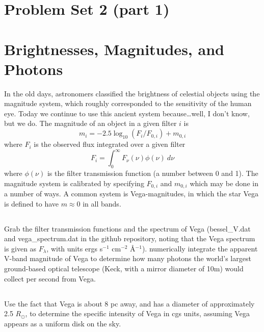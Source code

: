 \documentclass[11pt]{article}
\begin{document}
\pagestyle{empty}
\parindent=0pt

\section*{\centering Problem Set 2 (part 1)}

\section{Brightnesses, Magnitudes, and Photons}

In the old days, astronomers classified the brightness of celestial
objects using the magnitude system, which roughly corresponded to the
sensitivity of the human eye. Today we continue to use this ancient system
because\dots well, I don't know, but we do. The magnitude of
an object in a given filter $i$ is 
\begin{equation}
m_i = −2.5 \log_{10}(F_i/F_{0,i}) + m_{0,i}
\end{equation}
where $F_i$ is the observed flux integrated over a given filter
\begin{equation}
F_i = \int_0^\infty{F_\nu(\nu)\phi(\nu)~d\nu}
\end{equation}
where $\phi(\nu)$ is the filter transmission function (a number
between 0 and 1).  
The magnitude system is calibrated by specifying $F_{0,i}$ and $m_{0,i}$ which 
may be done in a number of ways. A common system is
Vega-magnitudes, in which the star Vega is defined to have $m\approx0$ in all bands.

\subsection{}
Grab the filter transmission functions and the spectrum of Vega 
(bessel\_V.dat and vega\_spectrum.dat in the github repository, noting that
the Vega spectrum is given as $F_\lambda$, with units ergs s$^{-1}$ cm$^{-2}$ \AA$^{-1}$).
numerically integrate the apparent V-band magnitude of Vega to determine how many
photons the world's largest ground-based optical telescope (Keck, with a mirror diameter of 10m)
would collect per second from Vega.  

\subsection{}
Use the fact that Vega is about 8 pc away, and has a diameter of approximately 2.5 $R_\odot$, to
determine the specific intensity of Vega in cgs units, assuming Vega appears as a uniform disk on the sky.
\end{document}
